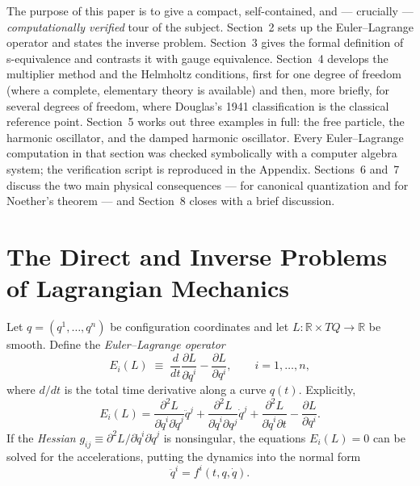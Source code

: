 \documentclass[11pt]{article}
\theoremstyle{remark}
\begin{document}
The purpose of this paper is to give a compact, self-contained, and --- crucially --- \emph{computationally verified} tour of the subject. Section~2 sets up the Euler--Lagrange operator and states the inverse problem. Section~3 gives the formal definition of s-equivalence and contrasts it with gauge equivalence. Section~4 develops the multiplier method and the Helmholtz conditions, first for one degree of freedom (where a complete, elementary theory is available) and then, more briefly, for several degrees of freedom, where Douglas's 1941 classification \cite{Douglas1941} is the classical reference point. Section~5 works out three examples in full: the free particle, the harmonic oscillator, and the damped harmonic oscillator. Every Euler--Lagrange computation in that section was checked symbolically with a computer algebra system; the verification script is reproduced in the Appendix. Sections~6 and~7 discuss the two main physical consequences --- for canonical quantization and for Noether's theorem --- and Section~8 closes with a brief discussion.

\section{The Direct and Inverse Problems of Lagrangian Mechanics}

Let $q=(q^1,\dots,q^n)$ be configuration coordinates and let $L:\mathbb R\times TQ\to\mathbb R$ be smooth. Define the \emph{Euler--Lagrange operator}
\begin{equation}
E_i(L) \;\equiv\; \frac{d}{dt}\frac{\partial L}{\partial \dot q^i}-\frac{\partial L}{\partial q^i}, \qquad i=1,\dots,n,
\end{equation}
where $d/dt$ is the total time derivative along a curve $q(t)$. Explicitly,
\begin{equation}
E_i(L) = \frac{\partial^2 L}{\partial \dot q^i \partial \dot q^j}\ddot q^j + \frac{\partial^2 L}{\partial \dot q^i \partial q^j}\dot q^j + \frac{\partial^2 L}{\partial \dot q^i \partial t} - \frac{\partial L}{\partial q^i}.
\end{equation}
If the \emph{Hessian} $g_{ij}\equiv \partial^2 L/\partial \dot q^i \partial \dot q^j$ is nonsingular, the equations $E_i(L)=0$ can be solved for the accelerations, putting the dynamics into the normal form
\begin{equation}
\ddot q^i = f^i(t,q,\dot q).
\label{eq:normalform}
\end{equation}
\end{document}
